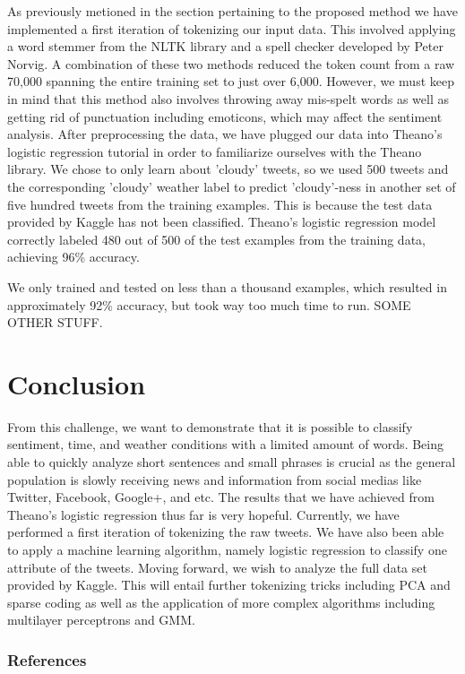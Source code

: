 \documentclass{article}
\begin{document}
As previously metioned in the section pertaining to the proposed method we have implemented a first iteration of tokenizing our input data. This involved applying a word stemmer from the NLTK library and a spell checker developed by Peter Norvig. A combination of these two methods reduced the token count from a raw 70,000 spanning the entire training set to just over 6,000. However, we must keep in mind that this method also involves throwing away mis-spelt words as well as getting rid of punctuation including emoticons, which may affect the sentiment analysis. After preprocessing the data, we have plugged our data into Theano's logistic regression tutorial in order to familiarize ourselves with the Theano library. We chose to only learn about 'cloudy' tweets, so we used 500 tweets and the corresponding 'cloudy' weather label to predict 'cloudy'-ness in another set of five hundred tweets from the training examples. This is because the test data provided by Kaggle has not been classified. Theano's logistic regression model correctly labeled 480 out of 500 of the test examples from the training data, achieving 96\% accuracy.

We only trained and tested on less than a thousand examples, which resulted in approximately 92\% accuracy, but took way too much time to run. SOME OTHER STUFF.

\section{Conclusion}
From this challenge, we want to demonstrate that it is possible to classify sentiment, time, and weather conditions with a limited amount of words. Being able to quickly analyze short sentences and small phrases is crucial as the general population is slowly receiving news and information from social medias like Twitter, Facebook, Google+, and etc. The results that we have achieved from Theano's logistic regression thus far is very hopeful. Currently, we have performed a first iteration of tokenizing the raw tweets. We have also been able to apply a machine learning algorithm, namely logistic regression to classify one attribute of the tweets. Moving forward, we wish to analyze the full data set provided by Kaggle. This will entail further tokenizing tricks including PCA and sparse coding as well as the application of more complex algorithms including multilayer perceptrons and GMM.

\subsubsection*{References}
\end{document}
